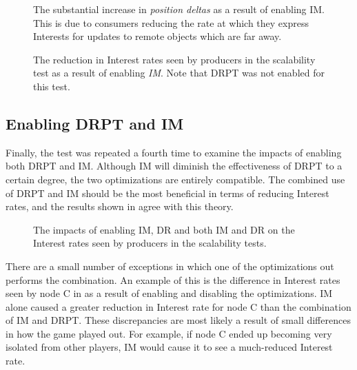 \begin{figure}[H]
    \centering
    \caption{The substantial increase in \textit{position deltas} as a result of enabling IM. This is due to consumers reducing the rate at which they express Interests for updates to remote objects which are far away. }
    \label{fig:eval:im:pos-deltas}
\end{figure}


\begin{figure}[H]
    \centering
    \caption{The reduction in Interest rates seen by producers in the scalability test as a result of enabling \textit{IM}. Note that DRPT was not enabled for this test.}
    \label{fig:eval:im:interest-impacts}
\end{figure}

\subsection{Enabling DRPT and IM}
Finally, the test was repeated a fourth time to examine the impacts of enabling both DRPT and IM. Although IM will diminish the effectiveness of DRPT to a certain degree, the two optimizations are entirely compatible. The combined use of DRPT and IM should be the most beneficial in terms of reducing Interest rates, and the results shown in  agree with this theory. 

\begin{figure}[H]
    \centering
    \caption{The impacts of enabling IM, DR and both IM and DR on the Interest rates seen by producers in the scalability tests.}
    \label{fig:eval:im-dr:impacts}
\end{figure}


There are a small number of exceptions in which one of the optimizations out performs the combination. An example of this is the difference in Interest rates seen by node C in  as a result of enabling and disabling the optimizations. IM alone caused a greater reduction in Interest rate for node C than the combination of IM and DRPT. These discrepancies are most likely a result of small differences in how the game played out. For example, if node C ended up becoming very isolated from other players, IM would cause it to see a much-reduced Interest rate. 

